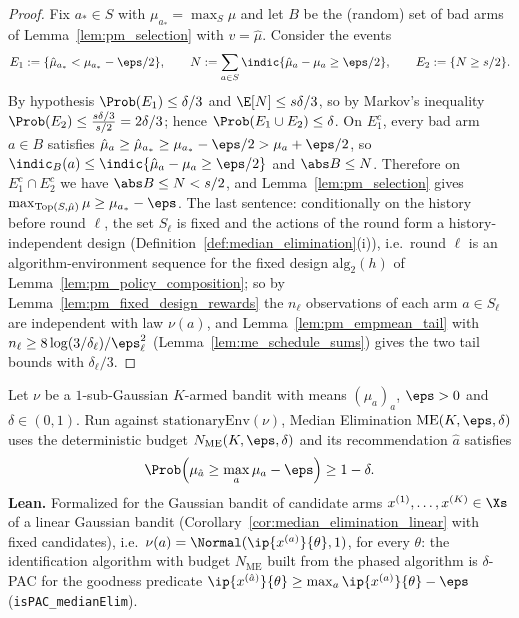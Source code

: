 \begin{proof}
\leanok
{}
Fix $a_*\in S$ with $\mu_{a_*} = \max_S\mu$ and let $B$ be the (random) set of bad arms of
Lemma~\ref{lem:pm_selection} with $v = \hat\mu$. Consider the events
\[
  E_1 := \{\hat\mu_{a_*}<\mu_{a_*}-\eps/2\},\qquad
  N := \sum_{a\in S}\indic\{\hat\mu_a-\mu_a\ge\eps/2\},\qquad E_2 := \{N\ge s/2\}.
\]
By hypothesis $\Prob(E_1)\le\delta/3$ and $\E[N]\le s\delta/3$, so by Markov's inequality
$\Prob(E_2)\le\frac{s\delta/3}{s/2} = 2\delta/3$; hence $\Prob(E_1\cup E_2)\le\delta$. On
$E_1^c$, every bad arm $a\in B$ satisfies $\hat\mu_a\ge\hat\mu_{a_*}\ge\mu_{a_*}-\eps/2>\mu_a+\eps/2$,
so $\indic_B(a)\le\indic\{\hat\mu_a-\mu_a\ge\eps/2\}$ and $\abs B\le N$. Therefore on
$E_1^c\cap E_2^c$ we have $\abs B\le N<s/2$, and Lemma~\ref{lem:pm_selection} gives
$\max_{\mathrm{Top}(S,\hat\mu)}\mu\ge\mu_{a_*}-\eps$. The last sentence: conditionally on the
history before round $\ell$, the set $S_\ell$ is fixed and the actions of the round form a
history-independent design (Definition~\ref{def:median_elimination}(i)), i.e.\ round $\ell$ is
an algorithm-environment sequence for the fixed design $\mathrm{alg}_2(h)$ of
Lemma~\ref{lem:pm_policy_composition}; so by
Lemma~\ref{lem:pm_fixed_design_rewards} the $n_\ell$ observations of each arm $a\in S_\ell$ are
independent with law $\nu(a)$, and Lemma~\ref{lem:pm_empmean_tail} with
$n_\ell\ge8\log(3/\delta_\ell)/\eps_\ell^2$ (Lemma~\ref{lem:me_schedule_sums}) gives the two tail
bounds with $\delta_\ell/3$.
\end{proof}

\begin{theorem}\label{thm:median_elimination}
\leanok
{}
Let $\nu$ be a $1$-sub-Gaussian $K$-armed bandit with means $(\mu_a)_a$, $\eps>0$ and
$\delta\in(0,1)$. Run against $\mathrm{stationaryEnv}(\nu)$, Median Elimination
$\mathrm{ME}(K,\eps,\delta)$ uses the deterministic budget $N_{\mathrm{ME}}(K,\eps,\delta)$ and
its recommendation $\hat a$ satisfies
\[
  \Prob\Big(\mu_{\hat a}\ge\max_{a}\mu_a-\eps\Big)\ge1-\delta .
\]
\textbf{Lean.} Formalized for the Gaussian bandit of candidate arms $x^{(1)},\dots,x^{(K)}\in\Xs$ of
a linear Gaussian bandit (Corollary~\ref{cor:median_elimination_linear} with fixed candidates),
i.e.\ $\nu(a) = \Normal(\ip{x^{(a)}}{\theta}, 1)$, for every $\theta$: the identification
algorithm with budget $N_{\mathrm{ME}}$ built from the phased algorithm is
$\delta$-PAC for the goodness predicate
$\ip{x^{(\hat a)}}{\theta}\ge\max_a\ip{x^{(a)}}{\theta}-\eps$ (\texttt{isPAC\_medianElim}).
\end{theorem}

